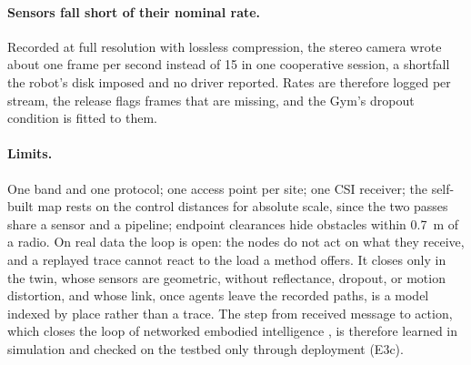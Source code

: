 \paragraph{Sensors fall short of their nominal rate.} Recorded at full
resolution with lossless compression, the stereo camera wrote about one
frame per second instead of 15 in one cooperative session, a shortfall
the robot's disk imposed and no driver reported. Rates are therefore
logged per stream, the release flags frames that are missing, and the
Gym's dropout condition is fitted to them.

\paragraph{Limits.} One band and one protocol; one access point per
site; one CSI receiver; the self-built map rests on the control
distances for absolute scale, since the two passes share a sensor and
a pipeline; endpoint clearances hide obstacles within
\SI{0.7}{\metre} of a radio.  On real data the loop is open: the nodes do not act
on what they receive, and a replayed trace cannot react to the load a
method offers. It closes only in the twin, whose sensors are geometric,
without reflectance, dropout, or motion distortion, and whose link, once
agents leave the recorded paths, is a model indexed by place rather than
a trace. The step from received message to action, which closes the
loop of networked embodied intelligence \cite{zhang2026mean}, is
therefore learned in simulation and checked on the testbed only through
deployment (E3c).
